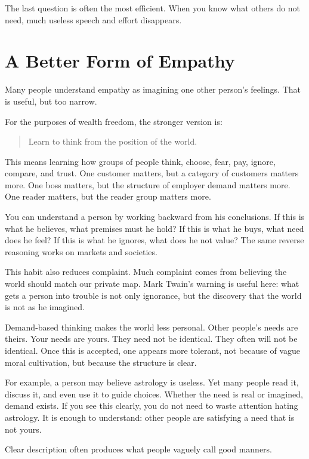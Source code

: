 The last question is often the most efficient. When you know what others do not need, much useless speech and effort disappears.

\section*{A Better Form of Empathy}

Many people understand empathy as imagining one other person's feelings. That is useful, but too narrow.

For the purposes of wealth freedom, the stronger version is:

\begin{quote}
Learn to think from the position of the world.
\end{quote}

This means learning how groups of people think, choose, fear, pay, ignore, compare, and trust. One customer matters, but a category of customers matters more. One boss matters, but the structure of employer demand matters more. One reader matters, but the reader group matters more.

You can understand a person by working backward from his conclusions. If this is what he believes, what premises must he hold? If this is what he buys, what need does he feel? If this is what he ignores, what does he not value? The same reverse reasoning works on markets and societies.

This habit also reduces complaint. Much complaint comes from believing the world should match our private map. Mark Twain's warning is useful here: what gets a person into trouble is not only ignorance, but the discovery that the world is not as he imagined.

Demand-based thinking makes the world less personal. Other people's needs are theirs. Your needs are yours. They need not be identical. They often will not be identical. Once this is accepted, one appears more tolerant, not because of vague moral cultivation, but because the structure is clear.

For example, a person may believe astrology is useless. Yet many people read it, discuss it, and even use it to guide choices. Whether the need is real or imagined, demand exists. If you see this clearly, you do not need to waste attention hating astrology. It is enough to understand: other people are satisfying a need that is not yours.

Clear description often produces what people vaguely call good manners.

